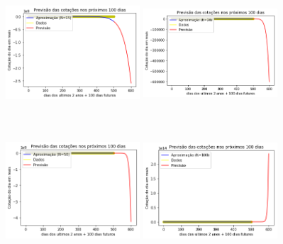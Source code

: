 \documentclass{article}
\begin{document}
\begin{figure}[!htb]
\includegraphics [width=5cm,height=5cm]{PrevisaoG/P15.png}
\includegraphics [width=5cm,height=5cm]{PrevisaoG/P20.png}
\includegraphics [width=5cm,height=5cm]{PrevisaoG/P50.png}
\includegraphics [width=5cm,height=5cm]{PrevisaoG/P100.png}
\end{figure}
\end{document}
